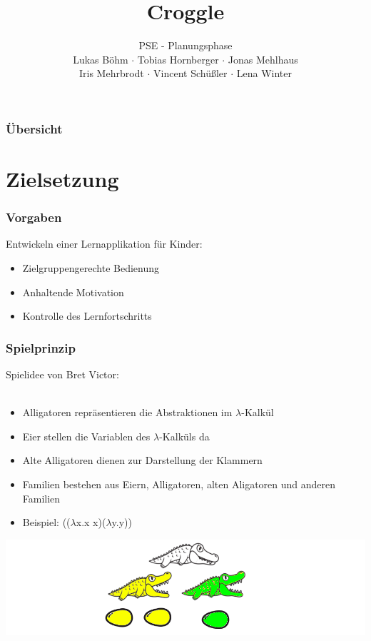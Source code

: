 \documentclass[t]{beamer}
\title{Croggle}
\subtitle{PSE - Planungsphase \\[0.3cm]
Lukas Böhm $\cdot$ Tobias Hornberger $\cdot$ Jonas Mehlhaus \\ Iris Mehrbrodt  $\cdot$ Vincent Schüßler $\cdot$ Lena Winter}
\institute[IPD]{Institut für Programmstruktutren und Datenorganisation}
\begin{document}
\begin{frame}
        \maketitle
\end{frame}

\begin{frame}
        \frametitle{Übersicht}
        \tableofcontents
\end{frame}

\section{Zielsetzung}
\begin{frame}
	\frametitle{Vorgaben}
	Entwickeln einer Lernapplikation für Kinder:\\
	\begin{itemize}
		\item Zielgruppengerechte Bedienung
		\item Anhaltende Motivation
		\item Kontrolle des Lernfortschritts
	\end{itemize}
\end{frame}

\begin{frame}
	\frametitle{Spielprinzip}
	Spielidee von Bret Victor: \\
     \\
	\begin{itemize}
		\item Alligatoren repräsentieren die Abstraktionen im \(\lambda\)-Kalkül
		\item Eier stellen die Variablen des \(\lambda\)-Kalküls da
		\item Alte Alligatoren dienen zur Darstellung der Klammern
		\item Familien bestehen aus Eiern, Alligatoren, alten Aligatoren und anderen Familien 
		\item Beispiel: ((\(\lambda\)x.x x)(\(\lambda\)y.y))
	\end{itemize}
	\includegraphics[width=\textwidth]{Spielelemente.png}
\end{frame}
\end{document}
